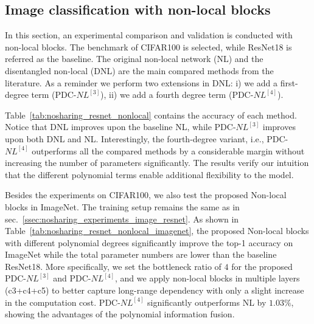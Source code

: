 \documentclass[runningheads]{llncs}
\newcommand{\resnet}{ResNet}
\newcommand{\noshare}{PDC}
\begin{document}
\subsection{Image classification with non-local blocks}
\label{ssec:nosharing_experiments_image_nonlocal}

In this section, an experimental comparison and validation is conducted with non-local blocks. The benchmark of CIFAR100 is selected, while \resnet18 is referred as the baseline. The original non-local network (NL) and the disentangled non-local (DNL) are the main compared methods from the literature. As a reminder we perform two extensions in DNL: i) we add a first-degree term (\noshare-$NL^{[3]}$), ii) we add a fourth degree term (\noshare-$NL^{[4]}$).

Table~\ref{tab:nosharing_resnet_nonlocal} contains the accuracy of each method. Notice that DNL improves upon the baseline NL, while \noshare-$NL^{[3]}$ improves upon both DNL and NL. Interestingly, the fourth-degree variant, i.e., \noshare-$NL^{[4]}$ outperforms all the compared methods by a considerable margin without increasing the number of parameters significantly. The results verify our intuition that the different polynomial terms enable additional flexibility to the model. 

Besides the experiments on CIFAR100, we also test the proposed Non-local blocks in ImageNet. The training setup remains the same as in sec.~\ref{ssec:nosharing_experiments_image_resnet}. As shown in Table~\ref{tab:nosharing_resnet_nonlocal_imagenet}, the proposed Non-local blocks with different polynomial degrees significantly improve the top-1 accuracy on ImageNet while the total parameter numbers are lower than the baseline \resnet18. 
More specifically, we set the bottleneck ratio of $4$ for the proposed \noshare-$NL^{[3]}$ and \noshare-$NL^{[4]}$, and we apply non-local blocks in multiple layers (c3+c4+c5) to better capture long-range dependency with only a slight increase in the computation cost. \noshare-$NL^{[4]}$ significantly outperforms NL by $1.03\%$, showing the advantages of the polynomial information fusion.




     
\end{document}
